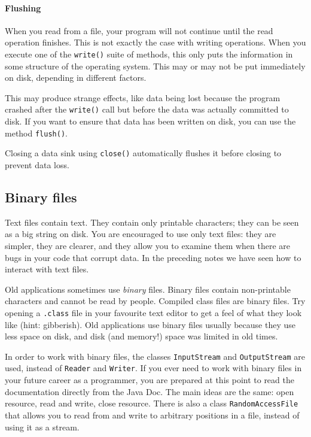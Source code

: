 

\paragraph{Flushing}
\label{sec:flushing}

When you read from a file, your program will not continue until the
read operation finishes. This is not exactly the case with writing
operations. When you execute one of the \verb+write()+ suite of methods, this only
puts the information in some structure of the operating system. This
may or may not be put immediately on disk, depending in different
factors. 

This may produce strange effects, like data being lost because the
program crashed after the \verb+write()+ call but before the data was
actually committed to disk. If you want to ensure that data has been
written on disk, you can use the method \verb+flush()+. 

Closing a data sink using \verb+close()+ 
automatically flushes it before closing to prevent data loss. 


\subsection{Binary files}
\label{sec:binary-files}

Text files contain text. They contain only printable characters; they
can be seen as a big string on disk. You are encouraged to
use only text files: they are simpler, they are clearer, and they
allow you to examine them when there are bugs in your code that
corrupt data. In the
preceding notes we have seen how to interact with text files. 

Old applications sometimes use \emph{binary} files. Binary files
contain non-printable characters and cannot be read by
people. Compiled class files are binary files. Try
opening a \verb+.class+ file in your favourite text editor to get a
feel of what they look like (hint: gibberish). Old applications use
binary files usually because they use less space on disk, and disk (and
memory!) space was limited in old times. 

In order to work with binary files, the classes \verb+InputStream+ and
\verb+OutputStream+ are used, instead of \verb+Reader+ and
\verb+Writer+. If you ever need to work with binary files in your
future career as a programmer, you are prepared at this point to read
the documentation directly from the Java Doc. The main ideas are the
same: open resource, read and write, close resource. There is also a
class \verb+RandomAccessFile+ that allows you to read from and write
to arbitrary positions in a file, instead of using it as a stream. 

